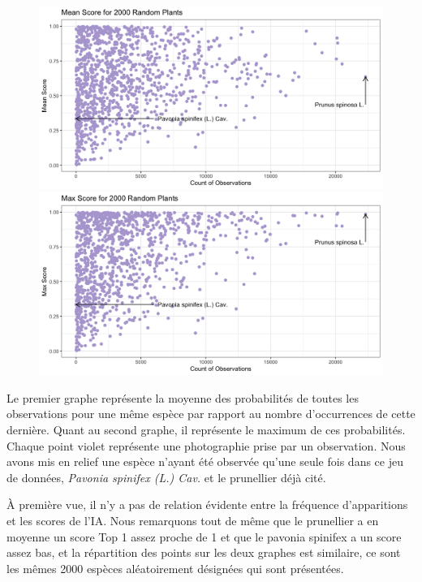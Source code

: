 \documentclass[a4paper,12pt]{article}
\begin{document}
\begin{figure}[H]
\centering
\begin{minipage}{0.5\textwidth}
  \includegraphics[width=0.8\linewidth]{images/mean_rd.png}
\end{minipage}%
\begin{minipage}{0.5\textwidth}
  \includegraphics[width=0.8\linewidth]{images/max_rd.png}
\end{minipage}
\end{figure}

Le premier graphe représente la moyenne des probabilités de toutes les observations pour une même espèce par rapport au nombre d'occurrences de cette dernière. Quant au second graphe, il représente le maximum de ces probabilités. Chaque point violet représente une photographie prise par un observation.
Nous avons mis en relief une espèce n'ayant été observée qu'une seule fois dans ce jeu de données, \textit{Pavonia spinifex (L.) Cav.} et le prunellier déjà cité.

\vspace{2.0cm}

À première vue, il n'y a pas de relation évidente entre la fréquence d'apparitions et les scores de l'IA. Nous remarquons tout de même que le prunellier a en moyenne un score Top 1 assez proche de 1 et que le pavonia spinifex a un score assez bas, et la répartition des points sur les deux graphes est similaire, ce sont les mêmes 2000 espèces aléatoirement désignées qui sont présentées.
\end{document}
